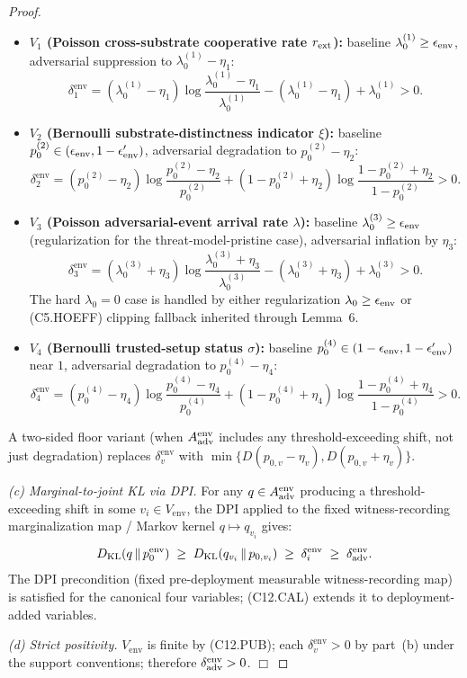 \begin{proof}
\begin{itemize}
\item \textbf{$V_1$ (Poisson cross-substrate cooperative rate
$r_{\mathrm{ext}}$):} baseline $\lambda_0^{(1)} \geq \epsilon_{\mathrm{env}}$, adversarial
suppression to $\lambda_0^{(1)} - \eta_1$:
\[
  \delta_1^{\mathrm{env}} = (\lambda_0^{(1)} - \eta_1)
  \log\!\frac{\lambda_0^{(1)} - \eta_1}{\lambda_0^{(1)}} -
  (\lambda_0^{(1)} - \eta_1) + \lambda_0^{(1)} > 0.
\]
\item \textbf{$V_2$ (Bernoulli substrate-distinctness indicator
$\xi$):} baseline $p_0^{(2)} \in (\epsilon_{\mathrm{env}}, 1 - \epsilon_{\mathrm{env}}')$, adversarial
degradation to $p_0^{(2)} - \eta_2$:
\[
  \delta_2^{\mathrm{env}} = (p_0^{(2)} - \eta_2)
  \log\!\frac{p_0^{(2)} - \eta_2}{p_0^{(2)}} +
  (1 - p_0^{(2)} + \eta_2) \log\!\frac{1 - p_0^{(2)} + \eta_2}
  {1 - p_0^{(2)}} > 0.
\]
\item \textbf{$V_3$ (Poisson adversarial-event arrival rate
$\lambda$):} baseline $\lambda_0^{(3)} \geq \epsilon_{\mathrm{env}}$ (regularization
for the threat-model-pristine case), adversarial inflation by
$\eta_3$:
\[
  \delta_3^{\mathrm{env}} = (\lambda_0^{(3)} + \eta_3)
  \log\!\frac{\lambda_0^{(3)} + \eta_3}{\lambda_0^{(3)}} -
  (\lambda_0^{(3)} + \eta_3) + \lambda_0^{(3)} > 0.
\]
The hard $\lambda_0 = 0$ case is handled by either regularization
$\lambda_0 \geq \epsilon_{\mathrm{env}}$ or (C5.HOEFF) clipping fallback inherited
through Lemma~6.
\item \textbf{$V_4$ (Bernoulli trusted-setup status $\sigma$):}
baseline $p_0^{(4)} \in (1 - \epsilon_{\mathrm{env}}, 1 - \epsilon_{\mathrm{env}}')$ near $1$,
adversarial degradation to $p_0^{(4)} - \eta_4$:
\[
  \delta_4^{\mathrm{env}} = (p_0^{(4)} - \eta_4)
  \log\!\frac{p_0^{(4)} - \eta_4}{p_0^{(4)}} +
  (1 - p_0^{(4)} + \eta_4) \log\!\frac{1 - p_0^{(4)} + \eta_4}
  {1 - p_0^{(4)}} > 0.
\]
\end{itemize}

A two-sided floor variant (when $A_{\mathrm{adv}}^{\mathrm{env}}$ includes
any threshold-exceeding shift, not just degradation) replaces
$\delta_v^{\mathrm{env}}$ with $\min\{D(p_{0,v} - \eta_v),
D(p_{0,v} + \eta_v)\}$.

\emph{(c) Marginal-to-joint KL via DPI.}  For any $q \in
A_{\mathrm{adv}}^{\mathrm{env}}$ producing a threshold-exceeding shift in
some $v_i \in V_{\mathrm{env}}$, the DPI applied to the fixed
witness-recording marginalization map / Markov kernel
$q \mapsto q_{v_i}$ gives:
\[
  D_{\mathrm{KL}}(q \,\|\, p_0^{\mathrm{env}}) \;\geq\;
  D_{\mathrm{KL}}(q_{v_i} \,\|\, p_{0, v_i}) \;\geq\;
  \delta_i^{\mathrm{env}} \;\geq\; \delta_{\mathrm{adv}}^{\mathrm{env}}.
\]
The DPI precondition (fixed pre-deployment measurable
witness-recording map) is satisfied for the canonical four
variables; (C12.CAL) extends it to deployment-added variables.

\emph{(d) Strict positivity.}  $V_{\mathrm{env}}$ is finite by
(C12.PUB); each $\delta_v^{\mathrm{env}} > 0$ by part~(b) under
the support conventions; therefore $\delta_{\mathrm{adv}}^{\mathrm{env}} > 0$.
$\Box$
\end{proof}

